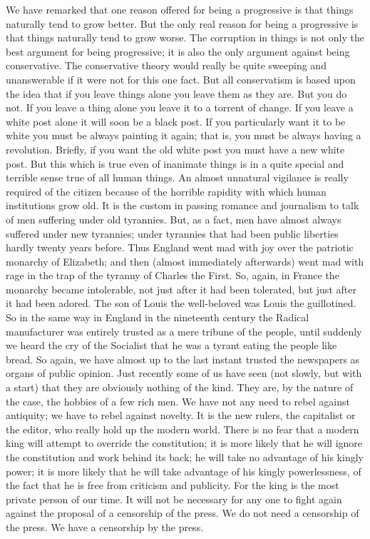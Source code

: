 We have remarked that one reason offered for being a progressive is that things naturally tend to grow better. But the only real reason for being a progressive is that things naturally tend to grow worse. The corruption in things is not only the best argument for being progressive; it is also the only argument against being conservative. The conservative theory would really be quite sweeping and unanswerable if it were not for this one fact. But all conservatism is based upon the idea that if you leave things alone you leave them as they are. But you do not. If you leave a thing alone you leave it to a torrent of change. If you leave a white post alone it will soon be a black post. If you particularly want it to be white you must be always painting it again; that is, you must be always having a revolution. Briefly, if you want the old white post you must have a new white post. But this which is true even of inanimate things is in a quite special and terrible sense true of all human things. An almost unnatural vigilance is really required of the citizen because of the horrible rapidity with which human institutions grow old. It is the custom in passing romance and journalism to talk of men suffering under old tyrannies. But, as a fact, men have almost always suffered under new tyrannies; under tyrannies that had been public liberties hardly twenty years before. Thus England went mad with joy over the patriotic monarchy of Elizabeth; and then (almost immediately afterwards) went mad with rage in the trap of the tyranny of Charles the First. So, again, in France the monarchy became intolerable, not just after it had been tolerated, but just after it had been adored. The son of Louis the well-beloved was Louis the guillotined. So in the same way in England in the nineteenth century the Radical manufacturer was entirely trusted as a mere tribune of the people, until suddenly we heard the cry of the Socialist that he was a tyrant eating the people like bread. So again, we have almost up to the last instant trusted the newspapers as organs of public opinion. Just recently some of us have seen (not slowly, but with a start) that they are obviously nothing of the kind. They are, by the nature of the case, the hobbies of a few rich men. We have not any need to rebel against antiquity; we have to rebel against novelty. It is the new rulers, the capitalist or the editor, who really hold up the modern world. There is no fear that a modern king will attempt to override the constitution; it is more likely that he will ignore the constitution and work behind its back; he will take no advantage of his kingly power; it is more likely that he will take advantage of his kingly powerlessness, of the fact that he is free from criticism and publicity. For the king is the most private person of our time. It will not be necessary for any one to fight again against the proposal of a censorship of the press. We do not need a censorship of the press. We have a censorship by the press.

